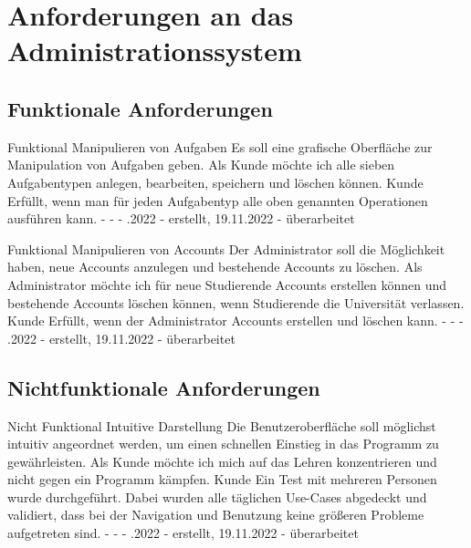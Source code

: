 \section*{Anforderungen an das Administrationssystem}
\subsection*{Funktionale Anforderungen}
\begin{myreq}
  \threeinline
    {}
    {\reqtype Funktional}
    {\reqevent Manipulieren von Aufgaben}
  \reqdesc Es soll eine grafische Oberfläche zur Manipulation von Aufgaben geben.
  \reqrat Als Kunde möchte ich alle sieben Aufgabentypen anlegen, bearbeiten, speichern und löschen können.
  \reqorig Kunde
  \reqfit Erfüllt, wenn man für jeden Aufgabentyp alle oben genannten Operationen ausführen kann.
  \twoinline
    {}
    {}
  \twoinline
  {\reqdep -}
  {\reqconf -}
  \reqmater -
  .2022 - erstellt, 19.11.2022 - überarbeitet
\end{myreq}

\begin{myreq}
  \threeinline
    {}
    {\reqtype Funktional}
    {\reqevent Manipulieren von Accounts }
  \reqdesc Der Administrator soll die Möglichkeit haben, neue Accounts anzulegen und bestehende Accounts zu löschen.
  \reqrat Als Administrator möchte ich für neue Studierende Accounts erstellen können und bestehende Accounts löschen können, wenn Studierende die Universität verlassen.
  \reqorig Kunde 
  \reqfit Erfüllt, wenn der Administrator Accounts erstellen und löschen kann.
  \twoinline
    {}
    {}
  \twoinline
  {\reqdep -}
  {\reqconf -}
  \reqmater -
  .2022 - erstellt, 19.11.2022 - überarbeitet
\end{myreq}

\subsection*{Nichtfunktionale Anforderungen}

\begin{myreq}
  \twoinline
    {}
    {\reqtype Nicht Funktional}
    {\reqevent Intuitive Darstellung}
  \reqdesc Die Benutzeroberfläche soll möglichst intuitiv angeordnet werden, um einen schnellen Einstieg in das Programm zu gewährleisten.
  \reqrat Als Kunde möchte ich mich auf das Lehren konzentrieren und nicht gegen ein Programm kämpfen.
  \reqorig Kunde
  \reqfit Ein Test mit mehreren Personen wurde durchgeführt. Dabei wurden alle täglichen Use-Cases abgedeckt und validiert, dass bei der Navigation und Benutzung keine größeren Probleme aufgetreten sind.
  \twoinline
    {}
    {}
  \twoinline
  {\reqdep -}
  {\reqconf -}
  \reqmater -
  .2022 - erstellt, 19.11.2022 - überarbeitet
\end{myreq}